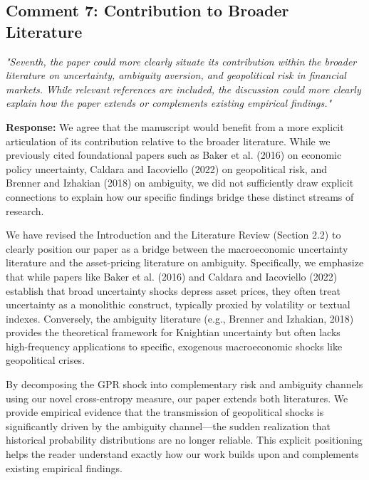\documentclass[12pt]{article}
\begin{document}
\subsection*{Comment 7: Contribution to Broader Literature}
\textit{"Seventh, the paper could more clearly situate its contribution within the broader literature on uncertainty, ambiguity aversion, and geopolitical risk in financial markets. While relevant references are included, the discussion could more clearly explain how the paper extends or complements existing empirical findings."}

\begin{highlightbox}
\textbf{Response:} We agree that the manuscript would benefit from a more explicit articulation of its contribution relative to the broader literature. While we previously cited foundational papers such as Baker et al. (2016) on economic policy uncertainty, Caldara and Iacoviello (2022) on geopolitical risk, and Brenner and Izhakian (2018) on ambiguity, we did not sufficiently draw explicit connections to explain how our specific findings bridge these distinct streams of research.

We have revised the Introduction and the Literature Review (Section 2.2) to clearly position our paper as a bridge between the macroeconomic uncertainty literature and the asset-pricing literature on ambiguity. Specifically, we emphasize that while papers like Baker et al. (2016) and Caldara and Iacoviello (2022) establish that broad uncertainty shocks depress asset prices, they often treat uncertainty as a monolithic construct, typically proxied by volatility or textual indexes. Conversely, the ambiguity literature (e.g., Brenner and Izhakian, 2018) provides the theoretical framework for Knightian uncertainty but often lacks high-frequency applications to specific, exogenous macroeconomic shocks like geopolitical crises.

By decomposing the GPR shock into complementary risk and ambiguity channels using our novel cross-entropy measure, our paper extends both literatures. We provide empirical evidence that the transmission of geopolitical shocks is significantly driven by the ambiguity channel—the sudden realization that historical probability distributions are no longer reliable. This explicit positioning helps the reader understand exactly how our work builds upon and complements existing empirical findings.
\end{highlightbox}
\end{document}
